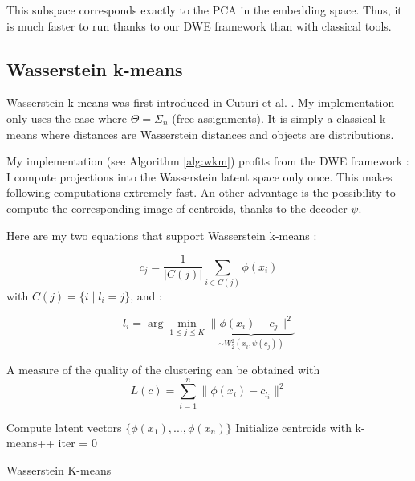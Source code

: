 \documentclass{article}
\begin{document}
This subspace corresponds exactly to the PCA in the embedding space. Thus, it is much faster to run thanks to our DWE framework than with classical tools.

\subsection{Wasserstein k-means}

Wasserstein k-means was first introduced in Cuturi et al. \cite{cuturi2014fast}. My implementation only uses the case where $\Theta = \Sigma_n$ (free assignments). It is simply a classical k-means where distances are Wasserstein distances and objects are distributions.

My implementation (see Algorithm \ref{alg:wkm}) profits from the DWE framework  : I compute projections into the Wasserstein latent space only once. This makes following computations extremely fast. An other advantage is the possibility to compute the corresponding image of centroids, thanks to the decoder $\psi$.

Here are my two equations that support Wasserstein k-means :

\begin{equation}
c_j = \frac{1}{|C(j)|} \sum_{i \in C(j)} \phi(x_i)
\label{centroids}
\end{equation}
with $C(j) = \{i \mid l_i = j\}$, and :

\begin{equation}
l_i = \arg \min_{1 \leq j \leq K} \underbrace{\| \phi(x_i) - c_j \|^2}_{\sim W_2^2(x_i, \psi(c_j))}
\label{assignment}
\end{equation}

A measure of the quality of the clustering can be obtained with
$$
L(c) = \sum_{i=1}^{n} \| \phi(x_i) - c_{l_i} \|^2
$$

\begin{algorithm}[H]
	Compute latent vectors $\{ \phi(x_1), ..., \phi(x_n)\}$\;
	Initialize centroids with k-means++\;
	iter = 0\;
	\caption{Wasserstein K-means}
	\label{alg:wkm}
\end{algorithm}
\end{document}
